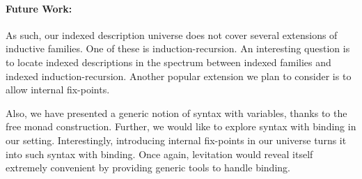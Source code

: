 \documentclass[preprint
              , authoryear
              ]{sigplanconf}
\begin{document}
\paragraph{Future Work:} As such, our indexed description universe does 
not cover several extensions of inductive families. One of these is
induction-recursion. An interesting question is to locate indexed
descriptions in the spectrum between indexed families and indexed
induction-recursion. Another popular extension we plan to consider is
to allow internal fix-points. 

Also, we have presented a generic notion of syntax with variables,
thanks to the free monad construction. Further, we would like to
explore syntax with binding in our setting. Interestingly, introducing
internal fix-points in our universe turns it into such syntax with
binding. Once again, levitation would reveal itself extremely
convenient by providing generic tools to handle binding.














\end{document}

